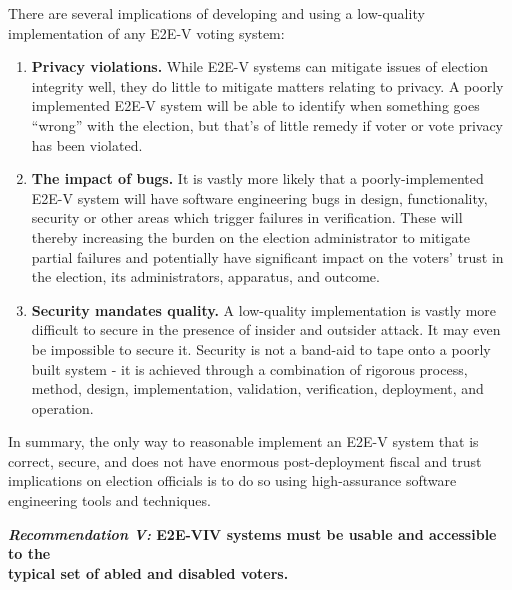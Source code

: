 There are several implications of developing and using a low-quality
implementation of any E2E-V voting system:
\begin{enumerate}
\item \textbf{Privacy violations. }While E2E-V systems can mitigate
  issues of election integrity well, they do little to mitigate
  matters relating to privacy. A poorly implemented E2E-V system will
  be able to identify when something goes ``wrong'' with the election,
  but that's of little remedy if voter or vote privacy has been
  violated.
  
\item \textbf{The impact of bugs.} It is vastly more likely that a poorly-implemented E2E-V system 
  will have software engineering bugs in design, functionality, security or other areas which trigger failures in
  verification. These will thereby increasing the burden on the election
  administrator to mitigate partial failures and potentially have
  significant impact on the voters' trust in the election, its administrators,
  apparatus, and outcome.
\item \textbf{Security mandates quality.} A low-quality implementation
  is vastly more difficult to secure in
  the presence of insider and outsider attack. It may even be impossible to secure it. Security is not a
  band-aid to tape onto a poorly built system - it is achieved through
  a combination of rigorous process, method, design, implementation,
  validation, verification, deployment, and operation.
\end{enumerate}

In summary, the only way to reasonable implement an E2E-V system that
is correct, secure, and does not have enormous post-deployment fiscal
and trust implications on election officials is to do so using
high-assurance software engineering tools and techniques.
\begin{center}
  \textbf{\emph{Recommendation V:} E2E-VIV systems must be usable and
  accessible to the\\
  typical set of abled and disabled voters.}
\end{center}

